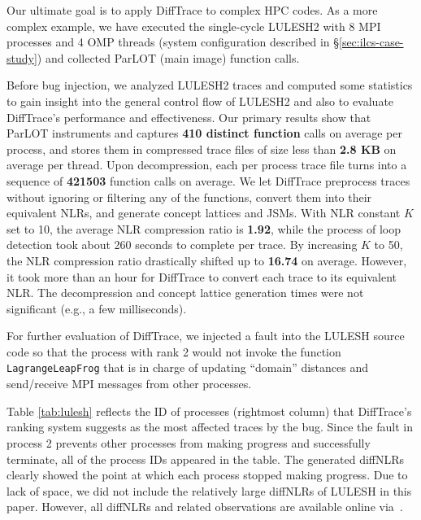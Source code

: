 

Our ultimate goal is to apply DiffTrace to complex HPC codes.
%
As a more complex example, we have executed the single-cycle LULESH2\cite{LULESH2:changes} with 8 MPI processes
and 4 OMP threads (system configuration described in \S\ref{sec:ilcs-case-study})
and collected ParLOT (main image) function calls.


Before bug injection, we analyzed LULESH2 traces and computed some statistics to gain insight into the
general control flow of LULESH2 and also to evaluate DiffTrace's
performance and effectiveness.
%
Our primary results show that ParLOT instruments and captures \textbf{410 distinct function} calls on
average per process, and stores them in compressed trace files of size less than \textbf{2.8 KB}
on average per thread.
%
Upon decompression, each per process trace file
turns into a sequence of \textbf{421503} function calls on average.
%
We let DiffTrace preprocess traces
without ignoring or filtering any of the functions,
convert them into their equivalent NLRs, and generate
concept lattices and JSMs. 
%
With NLR constant $K$ set to 10, the average NLR compression ratio is \textbf{1.92},
while the process of loop detection took about 260 seconds to complete per trace.
%
By increasing $K$ to 50, the NLR compression ratio drastically shifted up to \textbf{16.74} on average.
%
However, it took more than an hour for DiffTrace to convert each trace to its equivalent NLR. 
%
The decompression and concept lattice generation times were not significant (e.g., a few milliseconds).


For further evaluation of DiffTrace, we injected a fault into the LULESH source code so that the process with rank 2
would not invoke the function \texttt{LagrangeLeapFrog} that is in charge of updating ``domain'' distances and send/receive
MPI messages from other processes.
%

%
Table \ref{tab:lulesh} reflects the ID of processes (rightmost column)
that DiffTrace's ranking system suggests as the most affected traces by the bug.
%
Since the fault in process 2 prevents other processes from making progress and successfully terminate,
all of the process IDs appeared in the table.
The generated diffNLRs clearly showed the point at which each process stopped making progress.
%
Due to lack of space, we did not include the relatively large diffNLRs of LULESH in this paper.
However, all diffNLRs and related observations are available online via~\cite{diffTraceMaterials}.


